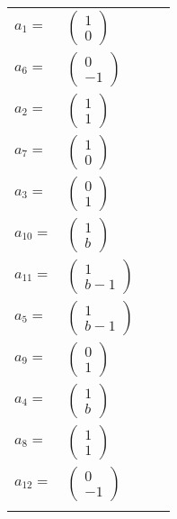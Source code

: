 \documentclass[1p]{elsarticle_modified}
\theoremstyle{definition}
\begin{document}
\begin{tabular}{m{7pt} m{180pt} m{7pt} m{180pt} }
\flushright $a_{1}=$&$\begin{pmatrix}1\\0\end{pmatrix}$ \\
\flushright $a_{6}=$&$\begin{pmatrix}0\\-1\end{pmatrix}$ \\
\flushright $a_{2}=$&$\begin{pmatrix}1\\1\end{pmatrix}$ \\
\flushright $a_{7}=$&$\begin{pmatrix}1\\0\end{pmatrix}$ \\
\flushright $a_{3}=$&$\begin{pmatrix}0\\1\end{pmatrix}$ \\
\flushright $a_{10}=$&$\begin{pmatrix}1\\b\end{pmatrix}$ \\
\flushright $a_{11}=$&$\begin{pmatrix}1\\b-1\end{pmatrix}$ \\
\flushright $a_{5}=$&$\begin{pmatrix}1\\b-1\end{pmatrix}$ \\
\flushright $a_{9}=$&$\begin{pmatrix}0\\1\end{pmatrix}$ \\
\flushright $a_{4}=$&$\begin{pmatrix}1\\b\end{pmatrix}$ \\
\flushright $a_{8}=$&$\begin{pmatrix}1\\1\end{pmatrix}$ \\
\flushright $a_{12}=$&$\begin{pmatrix}0\\-1\end{pmatrix}$\\&\end{tabular}
\end{document}
